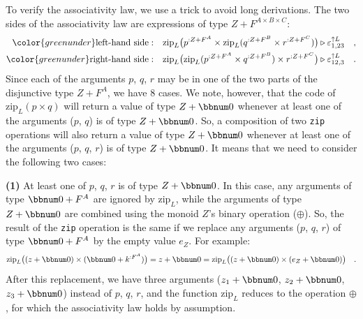 To verify the associativity law, we use a trick to avoid long derivations.
The two sides of the associativity law are expressions of type $Z+F^{A\times B\times C}$:
\begin{align*}
{\color{greenunder}\text{left-hand side}:}\quad & \text{zip}_{L}\big(p^{:Z+F^{A}}\times\text{zip}_{L}(q^{:Z+F^{B}}\times r^{:Z+F^{C}})\big)\triangleright\varepsilon_{1,23}^{\uparrow L}\quad,\\
{\color{greenunder}\text{right-hand side}:}\quad & \text{zip}_{L}\big(\text{zip}_{L}(p^{:Z+F^{A}}\times q^{:Z+F^{B}})\times r^{:Z+F^{C}}\big)\triangleright\varepsilon_{12,3}^{\uparrow L}\quad.
\end{align*}
Since each of the arguments $p$, $q$, $r$ may be in one of the
two parts of the disjunctive type $Z+F^{A}$, we have 8 cases. We
note, however, that the code of $\text{zip}_{L}(p\times q)$ will
return a value of type $Z+\bbnum 0$ whenever at least one of the
arguments ($p$, $q$) is of type $Z+\bbnum 0$. So, a composition
of two \lstinline!zip! operations will also return a value of type
$Z+\bbnum 0$ whenever at least one of the arguments ($p$, $q$,
$r$) is of type $Z+\bbnum 0$. It means that we need to consider
the following two cases: 

\textbf{(1)} At least one of $p$, $q$, $r$ is of type $Z+\bbnum 0$.
In this case, any arguments of type $\bbnum 0+F^{A}$ are ignored
by $\text{zip}_{L}$, while the arguments of type $Z+\bbnum 0$ are
combined using the monoid $Z$\textsf{'}s binary operation ($\oplus$). So,
the result of the \lstinline!zip! operation is the same if we replace
any arguments ($p$, $q$, $r$) of type $\bbnum 0+F^{A}$ by the
empty value $e_{Z}$. For example:
\[
\text{zip}_{L}\big((z+\bbnum 0)\times(\bbnum 0+k^{:F^{A}})\big)=z+\bbnum 0=\text{zip}_{L}\big((z+\bbnum 0)\times(e_{Z}+\bbnum 0)\big)\quad.
\]
After this replacement, we have three arguments ($z_{1}+\bbnum 0$,
$z_{2}+\bbnum 0$, $z_{3}+\bbnum 0$) instead of $p$, $q$, $r$,
and the function $\text{zip}_{L}$ reduces to the operation $\oplus$,
for which the associativity law holds by assumption.%


